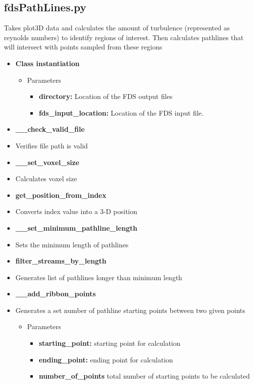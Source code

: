 \subsection{fdsPathLines.py}
\label{PythonPathLines}
Takes plot3D data and calculates the amount of turbulence (represented as reynolds numbers) to identify regions of interest. Then calculates pathlines that will intersect with points sampled from these regions
\begin{itemize}
    \item \textbf{Class instantiation}
    \begin{itemize}    
    \item Parameters   
        \begin{itemize}
        \item\textbf{directory:} Location of the FDS output files
        \item\textbf{fds\_input\_location:} Location of the FDS input file.
        \end{itemize} 
    \end{itemize}   
    
    \item \textbf{\_\_check\_valid\_file}
    \item[] Verifies file path is valid
    
    \item \textbf{\_\_set\_voxel\_size}
    \item[] Calculates voxel size
      
    \item \textbf{get\_position\_from\_index}
    \item[]  Converts index value into a 3-D position
    
    \item \textbf{\_\_set\_minimum\_pathline\_length}
    \item[] Sets the minimum length of pathlines

    \item \textbf{filter\_streams\_by\_length}
    \item[] Generates list of pathlines longer than minimum length

    \item \textbf{\_\_add\_ribbon\_points}
    \item[] Generates a set number of pathline starting points between two given points
    \begin{itemize}    
    \item Parameters   
        \begin{itemize}
        \item\textbf{starting\_point:} starting point for calculation
        \item\textbf{ending\_point:} ending point for calculation
        \item\textbf{number\_of\_points} total number of starting points to be calculated
        \end{itemize} 
    \end{itemize}   


\end{itemize}
